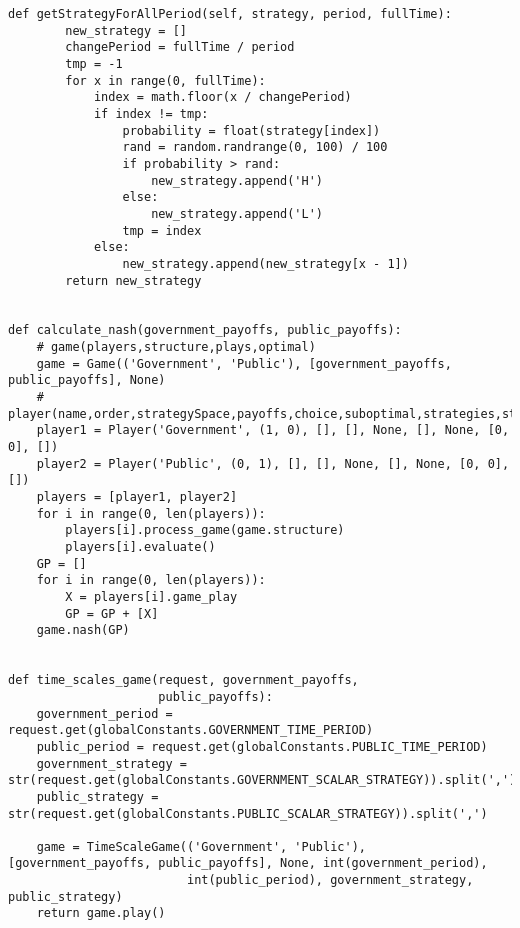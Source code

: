 \begin{lstlisting}[style=fsharpstyle]
    def getStrategyForAllPeriod(self, strategy, period, fullTime):
        new_strategy = []
        changePeriod = fullTime / period
        tmp = -1
        for x in range(0, fullTime):
            index = math.floor(x / changePeriod)
            if index != tmp:
                probability = float(strategy[index])
                rand = random.randrange(0, 100) / 100
                if probability > rand:
                    new_strategy.append('H')
                else:
                    new_strategy.append('L')
                tmp = index
            else:
                new_strategy.append(new_strategy[x - 1])
        return new_strategy


def calculate_nash(government_payoffs, public_payoffs):
    # game(players,structure,plays,optimal)
    game = Game(('Government', 'Public'), [government_payoffs, public_payoffs], None)
    # player(name,order,strategySpace,payoffs,choice,suboptimal,strategies,state,gameplay):
    player1 = Player('Government', (1, 0), [], [], None, [], None, [0, 0], [])
    player2 = Player('Public', (0, 1), [], [], None, [], None, [0, 0], [])
    players = [player1, player2]
    for i in range(0, len(players)):
        players[i].process_game(game.structure)
        players[i].evaluate()
    GP = []
    for i in range(0, len(players)):
        X = players[i].game_play
        GP = GP + [X]
    game.nash(GP)


def time_scales_game(request, government_payoffs,
                     public_payoffs):
    government_period = request.get(globalConstants.GOVERNMENT_TIME_PERIOD)
    public_period = request.get(globalConstants.PUBLIC_TIME_PERIOD)
    government_strategy = str(request.get(globalConstants.GOVERNMENT_SCALAR_STRATEGY)).split(',')
    public_strategy = str(request.get(globalConstants.PUBLIC_SCALAR_STRATEGY)).split(',')

    game = TimeScaleGame(('Government', 'Public'), [government_payoffs, public_payoffs], None, int(government_period),
                         int(public_period), government_strategy, public_strategy)
    return game.play()


 \end{lstlisting}